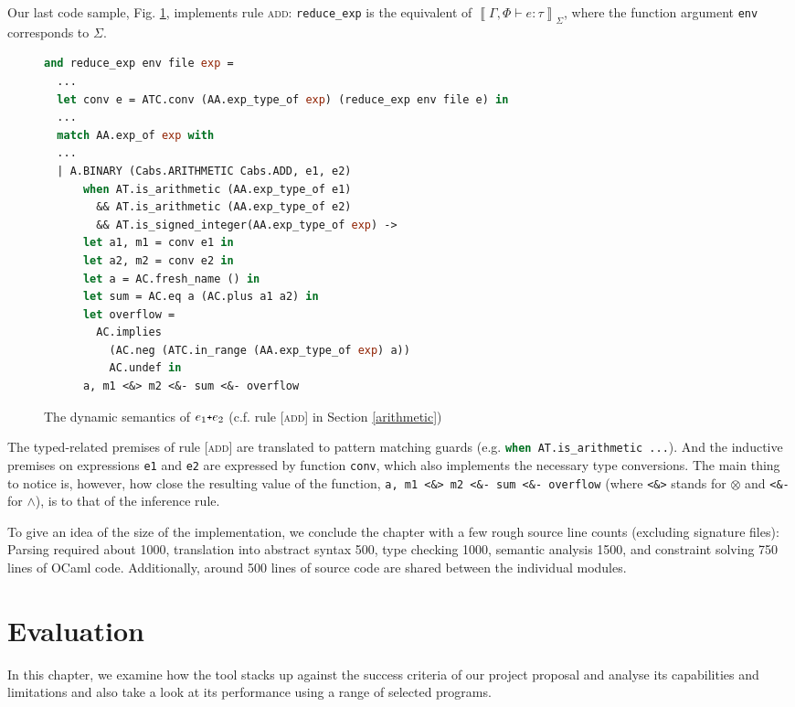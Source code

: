 \documentclass[a4paper,12pt]{scrbook}
\theoremstyle{plain}
\theoremstyle{definition}
\newcommand{\denott}[2]{
  \left\llbracket \Gamma, \Phi \vdash #1 : #2 \right\rrbracket_{\Sigma}
}
\newcommand{\cc}[1]{{\text{\footnotesize\ttfamily{#1}}}}
\begin{document}
Our last code sample, Fig. \ref{codeAdd}, implements rule \textsc{add}:
\lstinline[language=ML]{reduce_exp} is the equivalent of $\denott{e}{\tau}$,
where the function argument \lstinline[language=ML]{env} corresponds to
$\Sigma$.
\begin{figure}[hbt]
\begin{lstlisting}[language=ML, frame=tblr]
and reduce_exp env file exp =
  ...
  let conv e = ATC.conv (AA.exp_type_of exp) (reduce_exp env file e) in
  ...
  match AA.exp_of exp with
  ...
  | A.BINARY (Cabs.ARITHMETIC Cabs.ADD, e1, e2)
      when AT.is_arithmetic (AA.exp_type_of e1)
        && AT.is_arithmetic (AA.exp_type_of e2)
        && AT.is_signed_integer(AA.exp_type_of exp) ->
      let a1, m1 = conv e1 in
      let a2, m2 = conv e2 in
      let a = AC.fresh_name () in
      let sum = AC.eq a (AC.plus a1 a2) in
      let overflow =
        AC.implies
          (AC.neg (ATC.in_range (AA.exp_type_of exp) a))
          AC.undef in
      a, m1 <&> m2 <&- sum <&- overflow
\end{lstlisting}
\caption{The dynamic semantics of $e_1 \cc{+} e_2$ (c.f. rule \textsc{[add]} in
  Section \ref{arithmetic})}
\label{codeAdd}
\end{figure}
The typed-related premises of rule \textsc{[add]} are translated to pattern
matching guards (e.g. \lstinline[language=ML]{when AT.is_arithmetic ...}). And
the inductive premises on expressions \lstinline[language=ML]{e1} and
\lstinline[language=ML]{e2} are expressed by function
\lstinline[language=ML]{conv}, which also implements the necessary type
conversions. The main thing to notice is, however, how close the resulting value
of the function, \lstinline[language=ML]{a, m1 <&> m2 <&- sum <&- overflow}
(where \lstinline[language=ML]{<&>} stands for $\otimes$ and
\lstinline[language=ML]{<&-} for $\wedge$), is to that of the inference rule.

To give an idea of the size of the implementation, we conclude the chapter with
a few rough source line counts (excluding signature files): Parsing required
about 1000, translation into abstract syntax 500, type checking 1000, semantic
analysis 1500, and constraint solving 750 lines of OCaml code. Additionally,
around 500 lines of source code are shared between the individual modules.

\chapter{Evaluation}
In this chapter, we examine how the tool stacks up against the success criteria
of our project proposal and analyse its capabilities and limitations and also
take a look at its performance using a range of selected programs.
\end{document}
